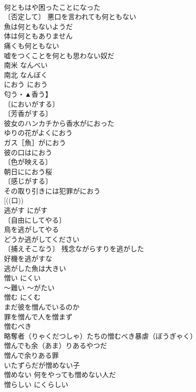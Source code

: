\documentclass[8pt]{extreport}
\begin{document}
\begin{CJK}{UTF8}{min}
\\	何ともはや困ったことになった 
\\	〔否定して〕 悪口を言われても何ともない 
\\	魚は何ともないようだ 
\\	体は何ともありません 
\\	痛くも何ともない 
\\	嘘をつくことを何とも思わない奴だ 
\\	南米	なんべい	
\\	南北	なんぼく	
\\	におう	におう
\\	匂う・▲香う】	
\\	〔においがする〕
\\	〔芳香がする〕
\\	彼女のハンカチから香水がにおった 
\\	ゆりの花がよくにおう 
\\	ガス［魚］がにおう 
\\	彼の口はにおう 
\\	〔色が映える〕　
\\	朝日ににおう桜 
\\	〔感じがする〕　
\\	その取り引きには犯罪がにおう 
\\	[((口)) 
\\	逃がす	にがす	
\\	〔自由にしてやる〕
\\	鳥を逃がしてやる 
\\	どうか逃がしてください 
\\	〔捕えそこなう〕 残念ながらすりを逃がした 
\\	好機を逃がすな 
\\	逃がした魚は大きい 
\\	憎い	にくい	
\\	～難い	～がたい	
\\	憎む	にくむ	
\\	まだ彼を憎んでいるのか 
\\	罪を憎んで人を憎まず 
\\	憎むべき 
\\	略奪者（りゃくだつしゃ）たちの憎むべき暴虐（ぼうぎゃく） 
\\	憎んでも余（あま）りあるやつだ 
\\	憎んで余りある罪 
\\	いたずらだが憎めない子 
\\	憎めない 何をやっても憎めない人だ 
\\	憎らしい	にくらしい	

\end{CJK}
\end{document}
